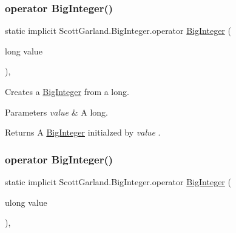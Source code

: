 \subsubsection{\texorpdfstring{operator Big\+Integer()}{operator BigInteger()}\hspace{0.1cm}{\footnotesize\ttfamily [1/4]}}
{\footnotesize\ttfamily static implicit Scott\+Garland.\+Big\+Integer.\+operator \hyperlink{class_scott_garland_1_1_big_integer}{Big\+Integer} (\begin{DoxyParamCaption}\item[{long}]{value }\end{DoxyParamCaption})\hspace{0.3cm}{\ttfamily [inline]}, {\ttfamily [static]}}



Creates a \hyperlink{class_scott_garland_1_1_big_integer}{Big\+Integer} from a long. 


\begin{DoxyParams}{Parameters}
{\em value} & A long.\\
\hline
\end{DoxyParams}
\begin{DoxyReturn}{Returns}
A \hyperlink{class_scott_garland_1_1_big_integer}{Big\+Integer} initialzed by {\itshape value} .
\end{DoxyReturn}
\mbox{\label{class_scott_garland_1_1_big_integer_a969d60de29a3f809ea166e6bd1c77302}} 
\subsubsection{\texorpdfstring{operator Big\+Integer()}{operator BigInteger()}\hspace{0.1cm}{\footnotesize\ttfamily [2/4]}}
{\footnotesize\ttfamily static implicit Scott\+Garland.\+Big\+Integer.\+operator \hyperlink{class_scott_garland_1_1_big_integer}{Big\+Integer} (\begin{DoxyParamCaption}\item[{ulong}]{value }\end{DoxyParamCaption})\hspace{0.3cm}{\ttfamily [inline]}, {\ttfamily [static]}}



